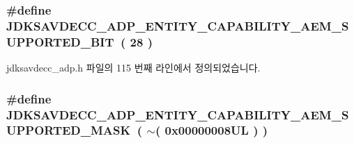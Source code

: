 \subsubsection[{\texorpdfstring{J\+D\+K\+S\+A\+V\+D\+E\+C\+C\+\_\+\+A\+D\+P\+\_\+\+E\+N\+T\+I\+T\+Y\+\_\+\+C\+A\+P\+A\+B\+I\+L\+I\+T\+Y\+\_\+\+A\+E\+M\+\_\+\+S\+U\+P\+P\+O\+R\+T\+E\+D\+\_\+\+B\+IT}{JDKSAVDECC_ADP_ENTITY_CAPABILITY_AEM_SUPPORTED_BIT}}]{\setlength{\rightskip}{0pt plus 5cm}\#define J\+D\+K\+S\+A\+V\+D\+E\+C\+C\+\_\+\+A\+D\+P\+\_\+\+E\+N\+T\+I\+T\+Y\+\_\+\+C\+A\+P\+A\+B\+I\+L\+I\+T\+Y\+\_\+\+A\+E\+M\+\_\+\+S\+U\+P\+P\+O\+R\+T\+E\+D\+\_\+\+B\+IT~( 28 )}\hypertarget{group__adp__entity__capability_gae685f86a4bac573bc9e4c5e9ab401216}{}\label{group__adp__entity__capability_gae685f86a4bac573bc9e4c5e9ab401216}


jdksavdecc\+\_\+adp.\+h 파일의 115 번째 라인에서 정의되었습니다.

\subsubsection[{\texorpdfstring{J\+D\+K\+S\+A\+V\+D\+E\+C\+C\+\_\+\+A\+D\+P\+\_\+\+E\+N\+T\+I\+T\+Y\+\_\+\+C\+A\+P\+A\+B\+I\+L\+I\+T\+Y\+\_\+\+A\+E\+M\+\_\+\+S\+U\+P\+P\+O\+R\+T\+E\+D\+\_\+\+M\+A\+SK}{JDKSAVDECC_ADP_ENTITY_CAPABILITY_AEM_SUPPORTED_MASK}}]{\setlength{\rightskip}{0pt plus 5cm}\#define J\+D\+K\+S\+A\+V\+D\+E\+C\+C\+\_\+\+A\+D\+P\+\_\+\+E\+N\+T\+I\+T\+Y\+\_\+\+C\+A\+P\+A\+B\+I\+L\+I\+T\+Y\+\_\+\+A\+E\+M\+\_\+\+S\+U\+P\+P\+O\+R\+T\+E\+D\+\_\+\+M\+A\+SK~( $\sim$( 0x00000008\+U\+L ) )}\hypertarget{group__adp__entity__capability_ga1f80443cb09165e6837f2b126341f9c5}{}\label{group__adp__entity__capability_ga1f80443cb09165e6837f2b126341f9c5}


